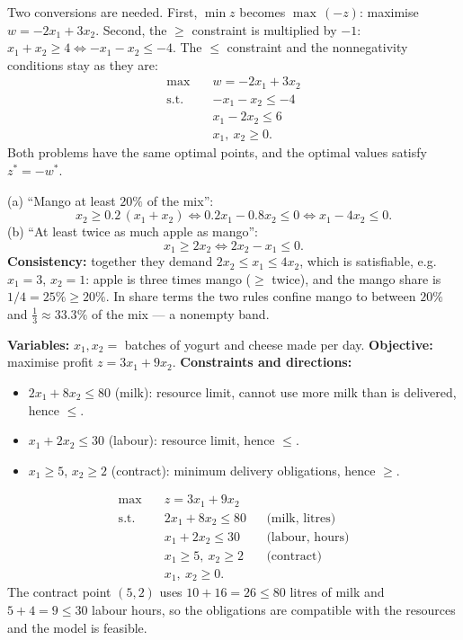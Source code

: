 \begin{solutions}
  \item Two conversions are needed. First, $\min z$ becomes
        $\max\,(-z)$: maximise $w=-2x_1+3x_2$. Second, the $\ge$
        constraint is multiplied by $-1$:
        $x_1+x_2\ge 4 \iff -x_1-x_2\le -4$. The $\le$ constraint and the
        nonnegativity conditions stay as they are:
        \[
          \begin{aligned}
            \max\quad & w=-2x_1+3x_2\\
            \text{s.t.}\quad & -x_1-x_2\le -4\\
            & x_1-2x_2\le 6\\
            & x_1,\ x_2\ge 0 .
          \end{aligned}
        \]
        Both problems have the same optimal points, and the optimal
        values satisfy $z^{*}=-w^{*}$.

  \item (a) ``Mango at least $20\%$ of the mix'':
        \[
          x_2\ge 0.2\,(x_1+x_2)
          \iff 0.2x_1-0.8x_2\le 0
          \iff x_1-4x_2\le 0 .
        \]
        (b) ``At least twice as much apple as mango'':
        \[
          x_1\ge 2x_2 \iff 2x_2-x_1\le 0 .
        \]
        \textbf{Consistency:} together they demand
        $2x_2\le x_1\le 4x_2$, which is satisfiable, e.g.\ $x_1=3$,
        $x_2=1$: apple is three times mango ($\ge$ twice), and the mango
        share is $1/4=25\%\ge 20\%$. In share terms the two rules confine
        mango to between $20\%$ and $\frac{1}{3}\approx 33.3\%$ of the
        mix — a nonempty band.

  \item \textbf{Variables:} $x_1,x_2=$ batches of yogurt and cheese made
        per day.
        \textbf{Objective:} maximise profit $z=3x_1+9x_2$.
        \textbf{Constraints and directions:}
        \begin{itemize}[leftmargin=1.6em,itemsep=0.3ex]
          \item $2x_1+8x_2\le 80$ (milk): resource limit, cannot use more
                milk than is delivered, hence $\le$.
          \item $x_1+2x_2\le 30$ (labour): resource limit, hence $\le$.
          \item $x_1\ge 5$, $x_2\ge 2$ (contract): minimum delivery
                obligations, hence $\ge$.
        \end{itemize}
        \[
          \begin{aligned}
            \max\quad & z=3x_1+9x_2\\
            \text{s.t.}\quad & 2x_1+8x_2\le 80 &&\text{(milk, litres)}\\
            & x_1+2x_2\le 30 &&\text{(labour, hours)}\\
            & x_1\ge 5,\ x_2\ge 2 &&\text{(contract)}\\
            & x_1,\ x_2\ge 0 .
          \end{aligned}
        \]
        The contract point $(5,2)$ uses $10+16=26\le 80$ litres of milk
        and $5+4=9\le 30$ labour hours, so the obligations are compatible
        with the resources and the model is feasible.


\end{solutions}

